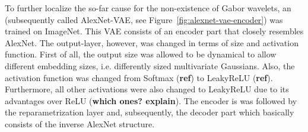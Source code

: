To further localize the so-far cause for the non-existence of Gabor wavelets, an  (subsequently called AlexNet-VAE, see Figure~\ref{fig:alexnet-vae-encoder}) was trained on ImageNet.
This \ac{VAE} consists of an encoder part that closely resembles AlexNet.
The output-layer, however, was changed in terms of size and activation function.
First of all, the output size was allowed to be dynamical to allow different embedding sizes, i.e. differently sized multivariate Gaussians.
Also, the activation function was changed from Softmax (\textbf{ref}) to \ac{LeakyReLU} (\textbf{ref}).
Furthermore, all other activations were also changed to \ac{LeakyReLU} due to its advantages over \ac{ReLU} (\textbf{which ones? explain}).
The encoder is was followed by the reparametrization layer and, subsequently, the decoder part which basically consists of the inverse AlexNet structure.\par

